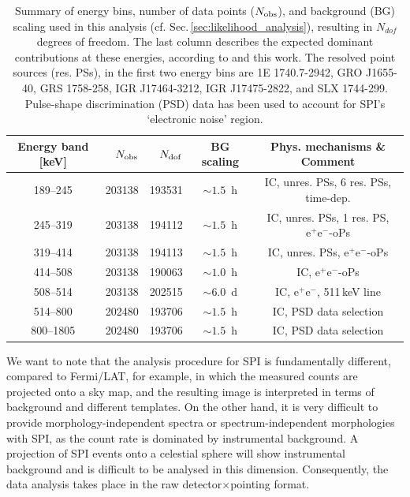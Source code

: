 \documentclass[doublespace,draft,nopageskip]{VTthesis} %
\newcommand{\mrm}[1]{\mathrm{#1}}
\begin{document}
\begin{appendices}
	\begin{table}
		\centering
		\caption{Summary of energy bins, number of data points ($N_{\rm obs}$), and background (BG) scaling used in this analysis (cf. Sec.\,\ref{sec:likelihood_analysis}), resulting in $N_{dof}$ degrees of freedom. The last column describes the expected dominant contributions at these energies, according to \citet{Strong2005_gammaconti} and this work. The resolved point sources (res. PSs), in the first two energy bins are 1E 1740.7-2942, GRO J1655-40, GRS 1758-258, IGR J17464-3212, IGR J17475-2822, and SLX 1744-299. Pulse-shape discrimination (PSD) data has been used to account for SPI's `electronic noise' region.}
		\begin{tabular}{crrcc}
			\hline
			\hline
			Energy band [keV] & $N_{\rm obs}$ & $N_{\rm dof}$ & BG scaling & Phys. mechanisms \& Comment \\
			\hline
			189--245  & 203138 & 193531 & $\sim 1.5$~h & IC, unres. PSs, 6 res. PSs, time-dep. \\
			245--319  & 203138 & 194112 & $\sim 1.5$~h & IC, unres. PSs, 1 res. PS, $\mrm{e^+e^-}$-oPs \\
			319--414  & 203138 & 194113 & $\sim 1.5$~h & IC, unres. PSs, $\mrm{e^+e^-}$-oPs \\
			414--508  & 203138 & 190063 & $\sim 1.0$~h & IC, $\mrm{e^+e^-}$-oPs \\
			508--514  & 203138 & 202515 & $\sim 6.0$~d & IC, $\mrm{e^+e^-}$, 511\,keV line\\
			514--800  & 202480 & 193706 & $\sim 1.5$~h & IC, PSD data selection \\
			800--1805 & 202480 & 193706 & $\sim 1.5$~h & IC, PSD data selection \\
			\hline
			\hline
		\end{tabular}
		\label{tab:data_set_energies}
	\end{table}
	
	
	
	We want to note that the analysis procedure for SPI is fundamentally different, compared to Fermi/LAT, for example, in which the measured counts are projected onto a sky map, and the resulting image is interpreted in terms of background and different templates.
	On the other hand, it is very difficult to provide morphology-independent spectra or spectrum-independent morphologies with SPI, as the count rate is dominated by instrumental background.
	A projection of SPI events onto a celestial sphere will show instrumental background and is difficult to be analysed in this dimension.
	Consequently, the data analysis takes place in the raw detector$\times$pointing format.
	

\end{appendices}
\end{document}
